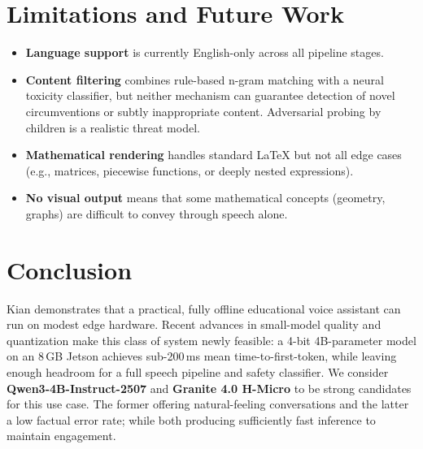 \documentclass[11pt]{article}
\begin{document}
\begin{table}[H]
\centering
\small

\caption{TTFT on short filler-word probe prompts (``Ummm'' and ``Okay''),
with responses capped at one token.
Each prompt arrives after 20 conversational turns,
so the history is already built up.
Probes that triggered a context trim are excluded so the figures isolate baseline inference latency on minimal user inputs.}
\label{tab:probe}
\end{table}



\section{Limitations and Future Work}

\begin{itemize}[nosep]
  \item \textbf{Language support} is currently English-only across all pipeline stages.
  \item \textbf{Content filtering} combines rule-based n-gram matching with a neural toxicity classifier,
    but neither mechanism can guarantee detection of novel circumventions or subtly inappropriate content.
    Adversarial probing by children is a realistic threat model.
  \item \textbf{Mathematical rendering} handles standard LaTeX but not all edge cases
    (e.g., matrices, piecewise functions, or deeply nested expressions).
  \item \textbf{No visual output} means that some mathematical concepts (geometry, graphs) are difficult to convey through speech alone.
\end{itemize}

\section{Conclusion}

Kian demonstrates that a practical, fully offline educational voice assistant can run on modest edge hardware.
Recent advances in small-model quality and quantization make this class of system newly feasible:
a 4-bit 4B-parameter model on an 8\,GB Jetson achieves sub-200\,ms mean time-to-first-token,
while leaving enough headroom for a full speech pipeline and safety classifier.
We consider \textbf{Qwen3-4B-Instruct-2507} and \textbf{Granite 4.0 H-Micro} to be strong candidates for this use case.
The former offering natural-feeling conversations and the latter a low factual error rate;
while both producing sufficiently fast inference to maintain engagement.
\end{document}
